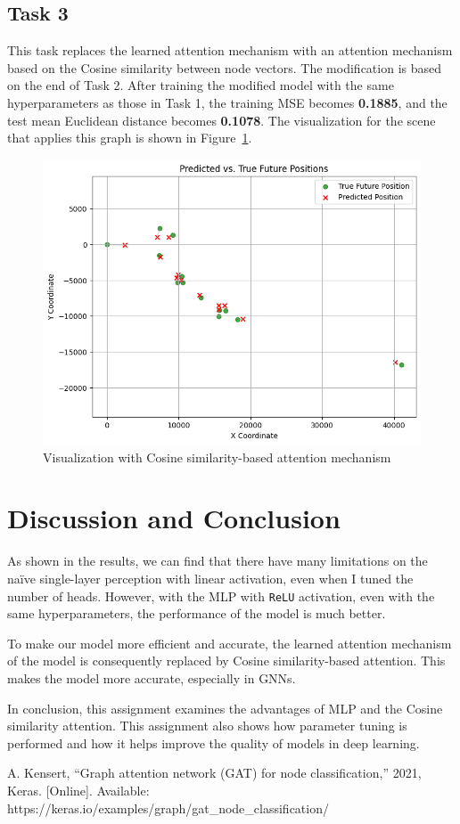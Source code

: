 \documentclass[conference]{IEEEtran}
\begin{document}
\subsection*{Task 3}

This task replaces the learned attention mechanism with an attention mechanism
based on the Cosine similarity between node vectors. The modification is based
on the end of Task 2. After training the modified model with the same
hyperparameters as those in Task 1, the training MSE becomes \textbf{0.1885},
and the test mean Euclidean distance becomes \textbf{0.1078}. The visualization
for the scene that applies this graph is shown in Figure~\ref{fig:visual3}.

\begin{figure}[htbp]
    \centering
    \includegraphics[width=0.8\linewidth]{figvisual3.png}
    \caption{Visualization with Cosine similarity-based attention mechanism}
    \label{fig:visual3}
\end{figure}

\section{Discussion and Conclusion}

As shown in the results, we can find that there have many limitations on the
naïve single-layer perception with linear activation, even when I tuned the
number of heads. However, with the MLP with \texttt{ReLU} activation, even with
the same hyperparameters, the performance of the model is much better.

To make our model more efficient and accurate, the learned attention mechanism
of the model is consequently replaced by Cosine similarity-based
attention. This makes the model more accurate, especially in GNNs.

In conclusion, this assignment examines the advantages of MLP and the Cosine
similarity attention. This assignment also shows how parameter tuning is
performed and how it helps improve the quality of models in deep learning.

\begin{thebibliography}{00}
 A. Kensert, “Graph attention network (GAT) for node
    classification,” 2021, Keras. [Online]. Available:
    https://keras.io/examples/graph/gat\_node\_classification/
\end{thebibliography}
\end{document}
